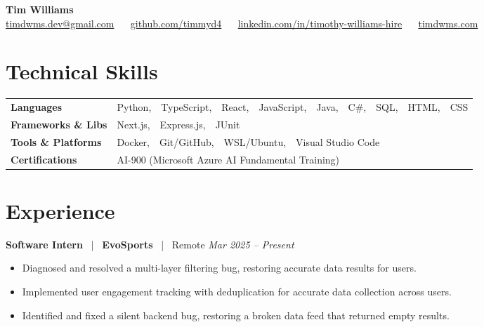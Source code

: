 \documentclass[10pt, letterpaper]{article}
\newcommand{\jobhead}[4]{%
  \vspace{5pt}%
  {\bfseries\color{dark}#1}%
  ~{\color{light}|}~%
  {\bfseries\color{navy}#2}%
  ~{\color{light}|}~%
  {\color{light}#3}%
  \hfill{\color{light}\small\textit{#4}}\\[-2pt]%
}
\newcommand{\skillrow}[2]{%
  {\bfseries #1} & #2 \\[2pt]%
}
\begin{document}

\begin{center}
  {\huge\bfseries\color{navy} Tim Williams}\\[4pt]
  {\small\color{light}
    \href{mailto:timdwms.dev@gmail.com}{timdwms.dev@gmail.com}
    ~\textbullet~
    \href{https://github.com/timmyd4}{github.com/timmyd4}
    ~\textbullet~
    \href{https://www.linkedin.com/in/timothy-williams-hire}{linkedin.com/in/timothy-williams-hire}
    ~\textbullet~
    \href{https://timdwms.com}{timdwms.com}
  }
\end{center}

\vspace{2pt}

\section{Technical Skills}

\begin{tabular}{@{}p{1.6in} p{5.2in}@{}}
  \skillrow{Languages}{Python,\ \ TypeScript,\ \ React,\ \ JavaScript,\ \ Java,\ \ C\#,\ \ SQL,\ \ HTML,\ \ CSS}
  \skillrow{Frameworks \& Libs}{Next.js,\ \ Express.js,\ \ JUnit}
  \skillrow{Tools \& Platforms}{Docker,\ \ Git/GitHub,\ \ WSL/Ubuntu,\ \ Visual Studio Code}
  \skillrow{Certifications}{AI-900 (Microsoft Azure AI Fundamental Training)}
\end{tabular}

\section{Experience}

\jobhead{Software Intern}{EvoSports}{Remote}{Mar 2025 – Present}
\begin{itemize}
  \item Diagnosed and resolved a multi-layer filtering bug, restoring accurate data results for users.
  \item Implemented user engagement tracking with deduplication for accurate data collection across users.
  \item Identified and fixed a silent backend bug, restoring a broken data feed that returned empty results.
\end{itemize}
\end{document}
